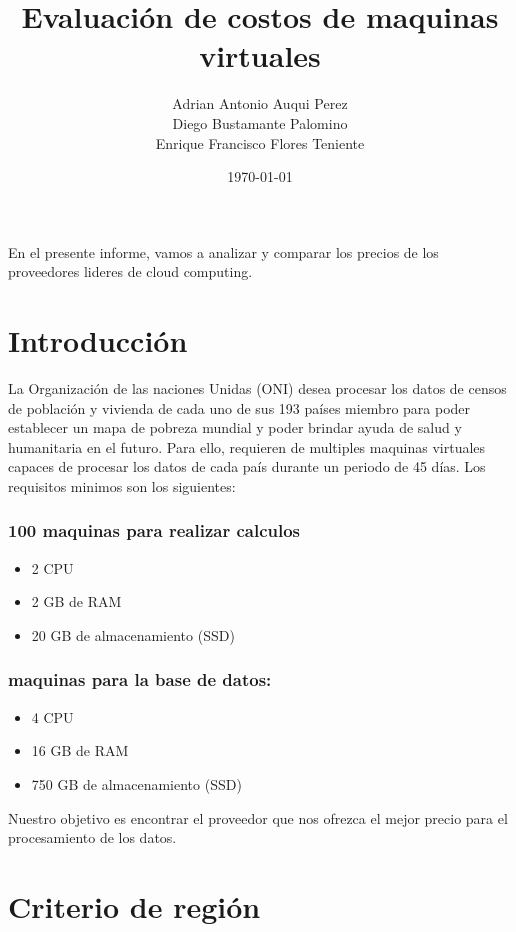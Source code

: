 \documentclass{article}
\title{Evaluación de costos de maquinas virtuales}
\date{\today}
\author{
    Adrian Antonio Auqui Perez \\
    Diego Bustamante Palomino \\
    Enrique Francisco Flores Teniente
  }
\affil{UTEC}
\begin{document}
\maketitle

En el presente informe, vamos a analizar y comparar los precios de los proveedores lideres de cloud computing.

\tableofcontents
\newpage

\section{Introducción}

La Organización de las naciones Unidas (ONI) desea
procesar los datos de censos de población y vivienda de
cada uno de sus 193 países miembro para poder establecer
un mapa de pobreza mundial y poder brindar ayuda de
salud y humanitaria en el futuro. Para ello, requieren de multiples maquinas virtuales capaces de procesar los datos de cada país durante un periodo de 45 días.
Los requisitos minimos son los siguientes:

\subsubsection*{100 maquinas para realizar calculos}
  \begin{itemize}
    \item 2 CPU
    \item 2 GB de RAM
    \item 20 GB de almacenamiento (SSD)
  \end{itemize}

\subsubsection*{maquinas para la base de datos:}
  \begin{itemize}
    \item 4 CPU
    \item 16 GB de RAM
    \item 750 GB de almacenamiento (SSD)
  \end{itemize}

Nuestro objetivo es encontrar el proveedor que nos ofrezca el mejor precio para el procesamiento de los datos.

\section{Criterio de región}
\end{document}
